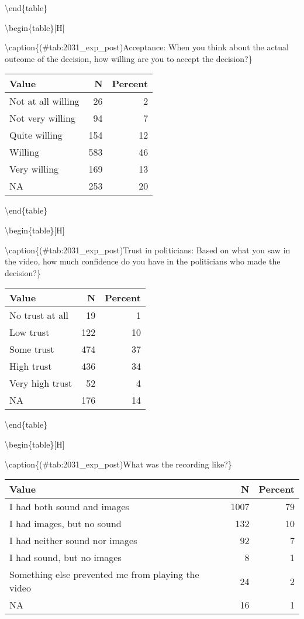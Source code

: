 \documentclass[
]{book}
\begin{document}
\textbackslash end\{table\}

\textbackslash begin\{table\}{[}H{]}

\textbackslash caption\{(\#tab:2031\_exp\_post)Acceptance: When you think about the actual outcome of the decision, how willing are you to accept the decision?\}
\centering

\begin{tabular}[t]{lrr}
\toprule
Value & N & Percent\\
\midrule
Not at all willing & 26 & 2\\
Not very willing & 94 & 7\\
Quite willing & 154 & 12\\
Willing & 583 & 46\\
Very willing & 169 & 13\\
NA & 253 & 20\\
\bottomrule
\end{tabular}

\textbackslash end\{table\}

\textbackslash begin\{table\}{[}H{]}

\textbackslash caption\{(\#tab:2031\_exp\_post)Trust in politicians: Based on what you saw in the video, how much confidence do you have in the politicians who made the decision?\}
\centering

\begin{tabular}[t]{lrr}
\toprule
Value & N & Percent\\
\midrule
No trust at all & 19 & 1\\
Low trust & 122 & 10\\
Some trust & 474 & 37\\
High trust & 436 & 34\\
Very high trust & 52 & 4\\
NA & 176 & 14\\
\bottomrule
\end{tabular}

\textbackslash end\{table\}

\textbackslash begin\{table\}{[}H{]}

\textbackslash caption\{(\#tab:2031\_exp\_post)What was the recording like?\}
\centering

\begin{tabular}[t]{lrr}
\toprule
Value & N & Percent\\
\midrule
I had both sound and images & 1007 & 79\\
I had images, but no sound & 132 & 10\\
I had neither sound nor images & 92 & 7\\
I had sound, but no images & 8 & 1\\
Something else prevented me from playing the video & 24 & 2\\
NA & 16 & 1\\
\bottomrule
\end{tabular}
\end{document}
